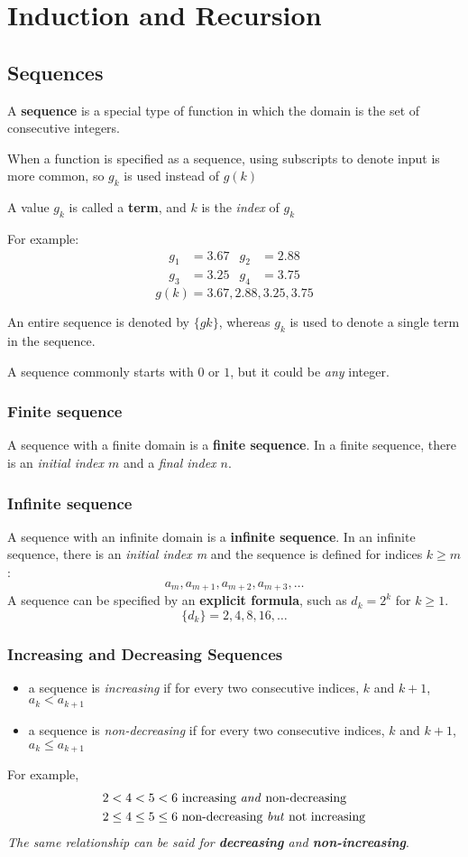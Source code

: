 \section{Induction and Recursion}
\subsection{Sequences}
A \textbf{sequence} is a special type of function in which the domain
is the set of consecutive integers.

When a function is specified as a sequence, using subscripts to denote input
is more common, so $g_k$ is used instead of $g(k)$

A value $g_k$ is called a \textbf{term}, and $k$ is the \textit{index} of $g_k$

For example:
\begin{align*}
  g_1 & = 3.67 & g_2 & = 2.88 \\
  g_3 & = 3.25 & g_4 & = 3.75
\end{align*}
\[
  g(k) = 3.67, 2.88, 3.25, 3.75
\]

An entire sequence is denoted by $\{gk\}$, whereas $g_k$ is used to denote a
single term in the sequence.

A sequence commonly starts with $0$ or $1$, but it could be \textit{any} integer.
\subsubsection*{Finite sequence}
A sequence with a finite domain is a \textbf{finite sequence}.
In a finite sequence, there is an \textit{initial index $m$} and a \textit{final index $n$}.
\subsubsection*{Infinite sequence}
A sequence with an infinite domain is a \textbf{infinite sequence}.
In an infinite sequence, there is an \textit{initial index m} and the sequence
is defined for indices $k \geq m$:
\[
  a_m, a_{m+1}, a_{m+2}, a_{m+3}, \ldots
\]
A sequence can be specified by an \textbf{explicit formula}, such as $d_k = 2^k$
for $k \geq 1$.
\[
  \{d_k\} = 2,4,8,16, \ldots
\]
\subsubsection*{Increasing and Decreasing Sequences}
\begin{itemize}
  \item a sequence is \textit{increasing} if for every two consecutive indices, $k$
        and $k+1$, $a_k < a_{k+1}$
  \item a sequence is \textit{non-decreasing} if for every two consecutive indices, $k$
        and $k+1$, $a_k \leq a_{k+1}$
\end{itemize}
For example,
\begin{align*}
  2 < 4 < 5 < 6          & ~\text{increasing \textit{and} non-decreasing}     \\
  2 \leq 4 \leq 5 \leq 6 & ~\text{non-decreasing \textit{but} not increasing}
\end{align*}
\textit{The same relationship can be said for \textbf{decreasing} and \textbf{non-increasing}}.

